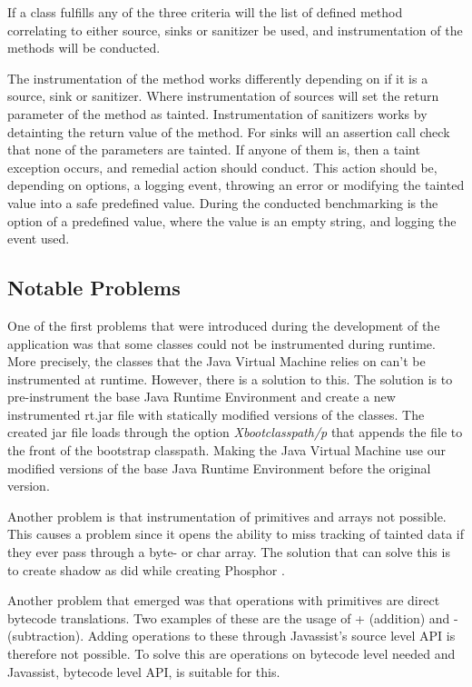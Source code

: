 If a class fulfills any of the three criteria will the list of defined method correlating to either source, sinks or sanitizer be used, and instrumentation of the methods will be conducted.

The instrumentation of the method works differently depending on if it is a source, sink or sanitizer. Where instrumentation of sources will set the return parameter of the method as tainted. Instrumentation of sanitizers works by detainting the return value of the method. For sinks will an assertion call check that none of the parameters are tainted. If anyone of them is, then a taint exception occurs, and remedial action should conduct. This action should be, depending on options, a logging event, throwing an error or modifying the tainted value into a safe predefined value. During the conducted benchmarking is the option of a predefined value, where the value is an empty string, and logging the event used.



\subsection{Notable Problems}
\label{NotableProblems}
One of the first problems that were introduced during the development of the application was that some classes could not be instrumented during runtime. More precisely, the classes that the Java Virtual Machine relies on can't be instrumented at runtime. However, there is a solution to this. The solution is to pre-instrument the base Java Runtime Environment and create a new instrumented rt.jar file with statically modified versions of the classes. The created jar file loads through the option \textit{Xbootclasspath/p} that appends the file to the front of the bootstrap classpath. Making the Java Virtual Machine use our modified versions of the base Java Runtime Environment \parencite{xboot} before the original version.

Another problem is that instrumentation of primitives and arrays not possible. This causes a problem since it opens the ability to miss tracking of tainted data if they ever pass through a byte- or char array. The solution that can solve this is to create shadow as \textcite{BellJ.2014PIdd} did while creating Phosphor \parencite{phosphor}. 

Another problem that emerged was that operations with primitives are direct bytecode translations. Two examples of these are the usage of + (addition) and - (subtraction). Adding operations to these through Javassist's source level API is therefore not possible. To solve this are operations on bytecode level needed and Javassist, bytecode level API, is suitable for this. \parencite{Javassist} 
